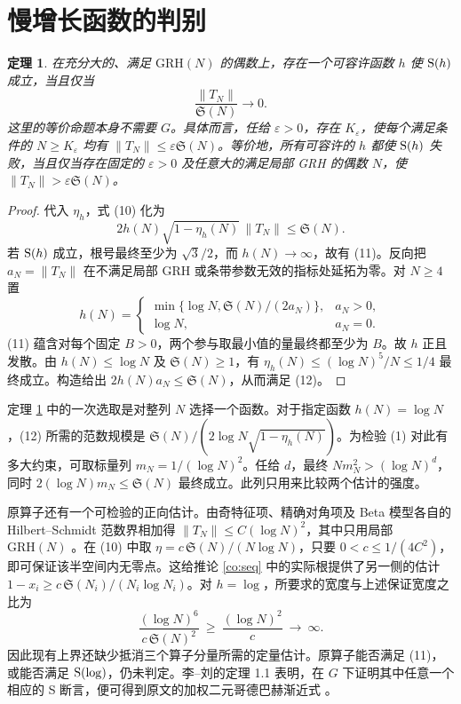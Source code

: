 \documentclass[UTF8,a4paper,11pt,fontset=windows]{ctexart}
\newtheorem{theorem}{定理}
\newcommand{\Sg}{\mathfrak S}
\newcommand{\GRH}{\mathrm{GRH}}
\begin{document}
\section{慢增长函数的判别}
\begin{theorem}\label{th:slow}
在充分大的、满足 \(\GRH(N)\) 的偶数上，存在一个可容许函数 \(h\) 使 \({\rm S}(h)\) 成立，当且仅当
\[
                 \frac{\|T_N\|}{\Sg(N)}\longrightarrow 0.    \tag{11}
\]
这里的等价命题本身不需要 \(G\)。具体而言，任给 \(\varepsilon>0\)，存在 \(K_\varepsilon\)，使每个满足条件的 \(N\ge K_\varepsilon\) 均有 \(\|T_N\|\le\varepsilon\Sg(N)\)。等价地，所有可容许的 \(h\) 都使 \({\rm S}(h)\) 失败，当且仅当存在固定的 \(\varepsilon>0\) 及任意大的满足局部 GRH 的偶数 \(N\)，使 \(\|T_N\|>\varepsilon\Sg(N)\)。
\end{theorem}
\begin{proof}
代入 \(\eta_h\)，式 (10) 化为
\[
         2h(N)\sqrt{1-\eta_h(N)}\,\|T_N\|\le\Sg(N).          \tag{12}
\]
若 \({\rm S}(h)\) 成立，根号最终至少为 \(\sqrt{3}/2\)，而 \(h(N)\to\infty\)，故有 (11)。反向把 \(a_N=\|T_N\|\) 在不满足局部 GRH 或条带参数无效的指标处延拓为零。对 \(N\ge4\) 置
\[
 h(N)=
 \begin{cases}
 \min\{\log N,\Sg(N)/(2a_N)\},& a_N>0,\\
 \log N,&a_N=0.
 \end{cases}
\]
(11) 蕴含对每个固定 \(B>0\)，两个参与取最小值的量最终都至少为 \(B\)。故 \(h\) 正且发散。由 \(h(N)\le\log N\) 及 \(\Sg(N)\ge1\)，有 \(\eta_h(N)\le(\log N)^5/N\le1/4\) 最终成立。构造给出 \(2h(N)a_N\le\Sg(N)\)，从而满足 (12)。
\end{proof}

定理 \ref{th:slow} 中的一次选取是对整列 \(N\) 选择一个函数。对于指定函数 \(h(N)=\log N\)，(12) 所需的范数规模是 \(\Sg(N)/(2\log N\sqrt{1-\eta_h(N)})\)。为检验 (1) 对此有多大约束，可取标量列 \(m_N=1/(\log N)^2\)。任给 \(d\)，最终 \(Nm_N^2>(\log N)^d\)，同时 \(2(\log N)m_N\le\Sg(N)\) 最终成立。此列只用来比较两个估计的强度。

原算子还有一个可检验的正向估计。由奇特征项、精确对角项及 Beta 模型各自的 Hilbert--Schmidt 范数界相加得 \(\|T_N\|\le C(\log N)^2\)，其中只用局部 \(\GRH(N)\) \cite[定理~6.2]{LL}。在 (10) 中取 \(\eta=c\,\Sg(N)/(N\log N)\)，只要 \(0<c\le1/(4C^2)\)，即可保证该半空间内无零点。这给推论 \ref{co:seq} 中的实际根提供了另一侧的估计 \(1-x_i\ge c\,\Sg(N_i)/(N_i\log N_i)\)。对 \(h=\log\)，所要求的宽度与上述保证宽度之比为
\[
       \frac{(\log N)^6}{c\,\Sg(N)^2}\ \ge\ \frac{(\log N)^2}{c}
       \ \longrightarrow\ \infty .
\]
因此现有上界还缺少抵消三个算子分量所需的定量估计。原算子能否满足 (11)，或能否满足 \({\rm S}(\log)\)，仍未判定。李--刘的定理 1.1 表明，在 \(G\) 下证明其中任意一个相应的 S 断言，便可得到原文的加权二元哥德巴赫渐近式 \cite{LL}。
\end{document}
